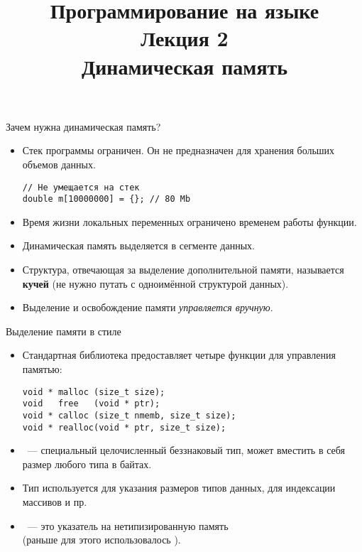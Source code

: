 \documentclass{beamer}
\title{{\bf Программирование на языке \langcpp\protect\\Лекция
2\protect\vspace{1em}\\}Динамическая память}
\begin{document}
\begin{frame} 
  \titlepage
\end{frame}


\begin{frame}[fragile]{Зачем нужна динамическая память?}
    \begin{itemize}
        \item Стек программы ограничен. Он не предназначен
            для хранения больших объемов данных.
\begin{lstlisting}
// Не умещается на стек
double m[10000000] = {}; // 80 Mb
\end{lstlisting}

        \item Время жизни локальных переменных ограничено
            временем работы функции.

        \item Динамическая память выделяется в сегменте данных.

        \item Структура, отвечающая за выделение дополнительной
            памяти, называется {\bf кучей} (не нужно путать
            с одноимённой структурой данных).

        \item Выделение и освобождение памяти {\em управляется вручную}.
    \end{itemize}
\end{frame}

\begin{frame}[fragile]{Выделение памяти в стиле \langc}
    \begin{itemize}
        \item Стандартная библиотека 
            предоставляет четыре функции для управления памятью:
            {\small
\begin{lstlisting}
void * malloc (size_t size);
void   free   (void * ptr);
void * calloc (size_t nmemb, size_t size);
void * realloc(void * ptr, size_t size);
\end{lstlisting}
}
        \item {}~--- специальный целочисленный беззнаковый тип, 
            может вместить в себя размер любого типа в байтах.

        \item Тип  используется для указания размеров типов данных,
            для индексации массивов и пр.

        \item {}~--- это указатель на нетипизированную память\\
            (раньше для этого использовалось ).

    \end{itemize}
\end{frame}
\end{document}
